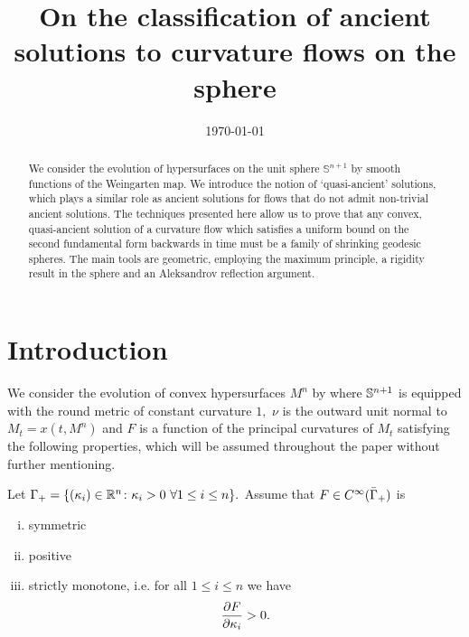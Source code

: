 \documentclass{amsart}
\begin{document}
\title[Ancient solutions to curvature flows in the sphere]
 {On the classification of ancient solutions to curvature flows on the sphere}

\curraddr{}
\email{}
\date{\today}

\dedicatory{}
\subjclass[2010]{}
\keywords{}

\begin{abstract}
We consider the evolution of hypersurfaces on the unit sphere $\mathbb{S}^{n+1}$ by smooth functions of the Weingarten map. We introduce the notion of `quasi-ancient' solutions, which plays a similar role as ancient solutions for flows that do not admit non-trivial ancient solutions. The techniques presented here allow us to prove that any convex, quasi-ancient solution of a curvature flow which satisfies a uniform bound on the second fundamental form backwards in time must be a family of shrinking geodesic spheres. The main tools are geometric, employing the maximum principle, a rigidity result in the sphere and an Aleksandrov reflection argument.
\end{abstract}

\maketitle

\section{Introduction}
\label{sec:intro}

We consider the evolution of convex hypersurfaces $M^n$ by
where \(\S^{n+1}\) is equipped with the round metric of constant curvature $1,$ $\nu$ is the outward unit normal to $M_t=x(t,M^n)$ and $F$ is a function of the principal curvatures of $M_t$ satisfying the following properties, which will be assumed throughout the paper without further mentioning.
\begin{ass} \label{F}
Let $\G_{+}=\{(\k_i)\in\R^n\cn \k_i>0~\forall 1\leq i\leq n\}.$ Assume that $F\in C^{\8}(\-\G_{+})$ is 
\begin{enumerate}[(i)]
\item{symmetric}
\item{positive}
\item{strictly monotone, i.e. for all $1\leq i\leq n$ we have
\[\fr{\del F}{\del \k_i}>0.\]}
\end{enumerate}
\end{ass}
\end{document}
